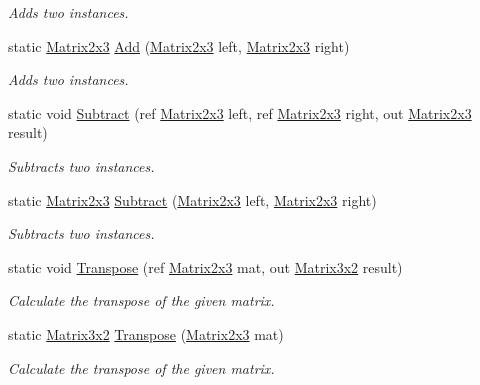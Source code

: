 \begin{DoxyCompactItemize}
\begin{DoxyCompactList}\small\item\em Adds two instances. \end{DoxyCompactList}\item 
static \hyperlink{struct_open_t_k_1_1_matrix2x3}{Matrix2x3} \hyperlink{struct_open_t_k_1_1_matrix2x3_a613191a18895a34dce280e1b71ccb6fb}{Add} (\hyperlink{struct_open_t_k_1_1_matrix2x3}{Matrix2x3} left, \hyperlink{struct_open_t_k_1_1_matrix2x3}{Matrix2x3} right)
\begin{DoxyCompactList}\small\item\em Adds two instances. \end{DoxyCompactList}\item 
static void \hyperlink{struct_open_t_k_1_1_matrix2x3_a4b1316f3f2a2e1e493651139b5308047}{Subtract} (ref \hyperlink{struct_open_t_k_1_1_matrix2x3}{Matrix2x3} left, ref \hyperlink{struct_open_t_k_1_1_matrix2x3}{Matrix2x3} right, out \hyperlink{struct_open_t_k_1_1_matrix2x3}{Matrix2x3} result)
\begin{DoxyCompactList}\small\item\em Subtracts two instances. \end{DoxyCompactList}\item 
static \hyperlink{struct_open_t_k_1_1_matrix2x3}{Matrix2x3} \hyperlink{struct_open_t_k_1_1_matrix2x3_a36b07d165b96af2e9399e712dcfc1c16}{Subtract} (\hyperlink{struct_open_t_k_1_1_matrix2x3}{Matrix2x3} left, \hyperlink{struct_open_t_k_1_1_matrix2x3}{Matrix2x3} right)
\begin{DoxyCompactList}\small\item\em Subtracts two instances. \end{DoxyCompactList}\item 
static void \hyperlink{struct_open_t_k_1_1_matrix2x3_ac22696b302b2ce4843f3960659a015a8}{Transpose} (ref \hyperlink{struct_open_t_k_1_1_matrix2x3}{Matrix2x3} mat, out \hyperlink{struct_open_t_k_1_1_matrix3x2}{Matrix3x2} result)
\begin{DoxyCompactList}\small\item\em Calculate the transpose of the given matrix. \end{DoxyCompactList}\item 
static \hyperlink{struct_open_t_k_1_1_matrix3x2}{Matrix3x2} \hyperlink{struct_open_t_k_1_1_matrix2x3_ae2c05e85bbedbf998d2e90218df93d37}{Transpose} (\hyperlink{struct_open_t_k_1_1_matrix2x3}{Matrix2x3} mat)
\begin{DoxyCompactList}\small\item\em Calculate the transpose of the given matrix. \end{DoxyCompactList}\item 

\end{DoxyCompactItemize}
